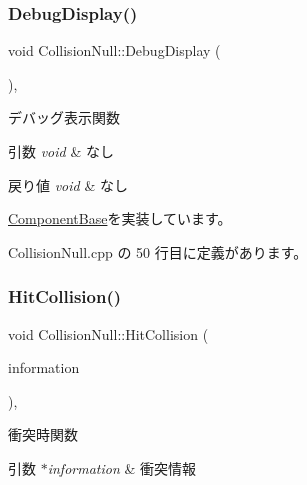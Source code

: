 \subsubsection{\texorpdfstring{Debug\+Display()}{DebugDisplay()}}
{\footnotesize\ttfamily void Collision\+Null\+::\+Debug\+Display (\begin{DoxyParamCaption}{ }\end{DoxyParamCaption})\hspace{0.3cm}{\ttfamily [override]}, {\ttfamily [virtual]}}



デバッグ表示関数 


\begin{DoxyParams}{引数}
{\em void} & なし \\
\hline
\end{DoxyParams}

\begin{DoxyRetVals}{戻り値}
{\em void} & なし \\
\hline
\end{DoxyRetVals}


\mbox{\hyperlink{class_component_base_a36ae7d27ad9d756fa245bad443020407}{Component\+Base}}を実装しています。



 Collision\+Null.\+cpp の 50 行目に定義があります。

\mbox{\label{class_collision_null_ad3473329f7af1b86ea6dfc1c4e8e81c1}} 
\subsubsection{\texorpdfstring{Hit\+Collision()}{HitCollision()}}
{\footnotesize\ttfamily void Collision\+Null\+::\+Hit\+Collision (\begin{DoxyParamCaption}\item[{\mbox{\hyperlink{class_collision_information}{Collision\+Information}} $\ast$}]{information }\end{DoxyParamCaption})\hspace{0.3cm}{\ttfamily [override]}, {\ttfamily [virtual]}}



衝突時関数 


\begin{DoxyParams}{引数}
{\em $\ast$information} & 衝突情報 \\
\hline
\end{DoxyParams}

